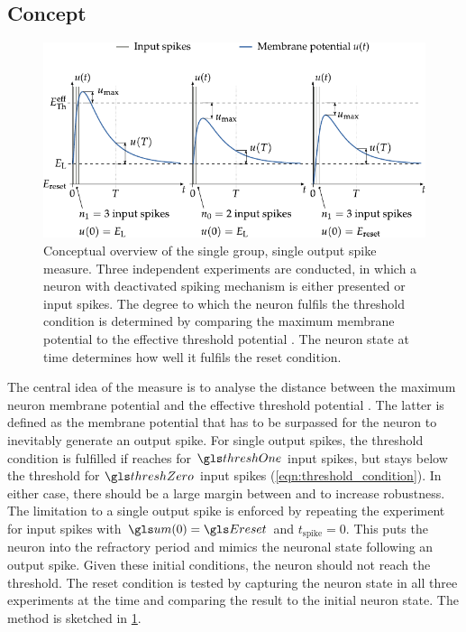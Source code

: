 \subsection{Concept}
\label{sec:sgso_measure_idea}

\begin{figure}
	\centering
	\includegraphics{media/chp4/single_group_eval.pdf}
	\caption[Conceptual overview of the single group, single output spike measure]{Conceptual overview of the single group, single output spike measure. Three independent experiments are conducted, in which a neuron with deactivated spiking mechanism is either presented \threshZero or \threshOne input spikes. The degree to which the neuron fulfils the threshold condition is determined by comparing the maximum membrane potential \umax to the effective threshold potential \EThEff. The neuron state at time \timeWindow determines how well it fulfils the reset condition.}
	\label{fig:single_group_eval}
\end{figure}

The central idea of the \SGSO measure is to analyse the distance between the maximum neuron membrane potential \umax and the effective threshold potential \EThEff. The latter is defined as the membrane potential that has to be surpassed for the neuron to inevitably generate an output spike. For single output spikes, the \BiNAM threshold condition is fulfilled if \umax reaches \EThEff for $\threshOne$ input spikes, but stays below the threshold for $\threshZero$ input spikes (\cref{eqn:threshold_condition}). In either case, there should be a large margin between \umax and \EThEff to increase robustness. The limitation to a single output spike is enforced by repeating the experiment for \threshOne input spikes with $\um(0) = \Ereset$ and $t_\mathrm{spike} = 0$. This puts the neuron into the refractory period and mimics the neuronal state following an output spike. Given these initial conditions, the neuron should not reach the threshold. The \BiNAM reset condition is tested by capturing the neuron state in all three experiments at the time \timeWindow and comparing the result to the initial neuron state. The method is sketched in \cref{fig:single_group_eval}.

